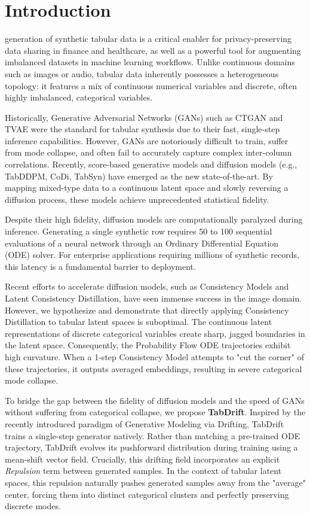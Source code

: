 \documentclass[10pt,journal,compsoc]{IEEEtran}
\begin{document}
\section{Introduction}
 generation of synthetic tabular data is a critical enabler for privacy-preserving data sharing in finance and healthcare, as well as a powerful tool for augmenting imbalanced datasets in machine learning workflows. Unlike continuous domains such as images or audio, tabular data inherently possesses a heterogeneous topology: it features a mix of continuous numerical variables and discrete, often highly imbalanced, categorical variables.

Historically, Generative Adversarial Networks (GANs) such as CTGAN and TVAE were the standard for tabular synthesis due to their fast, single-step inference capabilities. However, GANs are notoriously difficult to train, suffer from mode collapse, and often fail to accurately capture complex inter-column correlations. Recently, score-based generative models and diffusion models (e.g., TabDDPM, CoDi, TabSyn) have emerged as the new state-of-the-art. By mapping mixed-type data to a continuous latent space and slowly reversing a diffusion process, these models achieve unprecedented statistical fidelity. 

Despite their high fidelity, diffusion models are computationally paralyzed during inference. Generating a single synthetic row requires 50 to 100 sequential evaluations of a neural network through an Ordinary Differential Equation (ODE) solver. For enterprise applications requiring millions of synthetic records, this latency is a fundamental barrier to deployment. 

Recent efforts to accelerate diffusion models, such as Consistency Models and Latent Consistency Distillation, have seen immense success in the image domain. However, we hypothesize and demonstrate that directly applying Consistency Distillation to tabular latent spaces is suboptimal. The continuous latent representations of discrete categorical variables create sharp, jagged boundaries in the latent space. Consequently, the Probability Flow ODE trajectories exhibit high curvature. When a 1-step Consistency Model attempts to "cut the corner" of these trajectories, it outputs averaged embeddings, resulting in severe categorical mode collapse.

To bridge the gap between the fidelity of diffusion models and the speed of GANs without suffering from categorical collapse, we propose \textbf{TabDrift}. Inspired by the recently introduced paradigm of Generative Modeling via Drifting, TabDrift trains a single-step generator natively. Rather than matching a pre-trained ODE trajectory, TabDrift evolves its pushforward distribution during training using a mean-shift vector field. Crucially, this drifting field incorporates an explicit \textit{Repulsion} term between generated samples. In the context of tabular latent spaces, this repulsion naturally pushes generated samples away from the "average" center, forcing them into distinct categorical clusters and perfectly preserving discrete modes.
\end{document}
